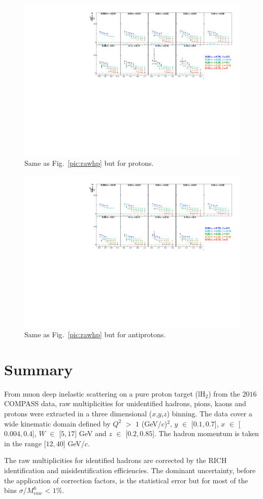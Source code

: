 \begin{figure}[!h]
  \includegraphics[scale=0.85]{./gfx/rawpp.pdf}
  \caption{Same as Fig.~\ref{pic:rawhp} but for protons.}
  \label{pic:rawpp}
\end{figure}

\newpage

\begin{figure}[!h]
  \includegraphics[scale=0.85]{./gfx/rawpm.pdf}
  \caption{Same as Fig.~\ref{pic:rawhp} but for antiprotons.}
  \label{pic:rawpm}
\end{figure}

\section{Summary}

From muon deep inelastic scattering on a pure proton target (lH$_2$) from the $2016$ COMPASS data, raw multiplicities for unidentified hadrons, pions, kaons and protons were extracted in a three dimensional ($x$,$y$,$z$) binning. The data cover a wide kinematic domain defined by $Q^2$ $>$ $1$ (GeV/$c$)$^2$, $y$ $\in$ [$0.1,0.7$], $x$ $\in$ [$0.004,0.4$], $W$ $\in$ [$5,17$] GeV and $z$ $\in$ [$0.2,0.85$]. The hadron momentum is taken in the range [$12,40$] GeV/$c$.

The raw multiplicities for identified hadrons are corrected by the RICH identification and misidentification efficiencies. The dominant uncertainty, before the application of correction factors, is the statistical error but for most of the bins $\sigma$/$M^h_{raw}$ < $1$\%.
